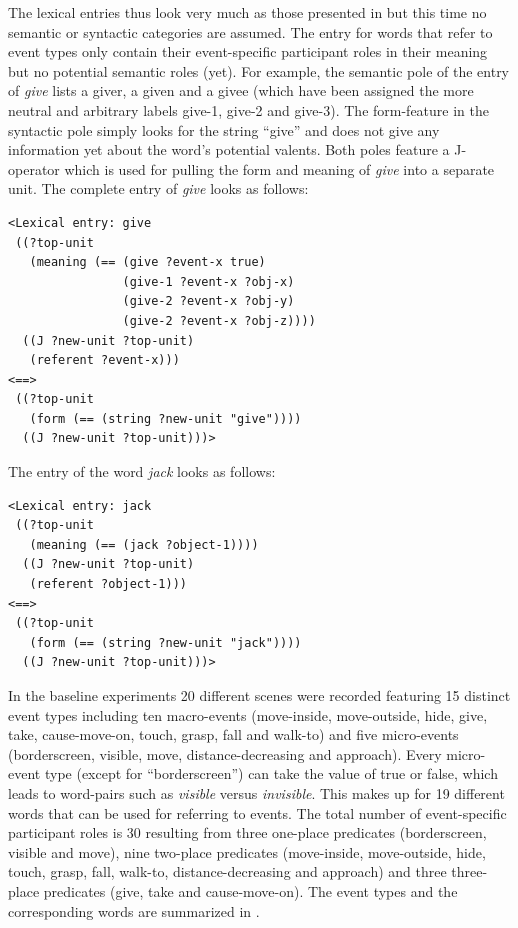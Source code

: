 The lexical entries thus look very much as those presented in  but this time no semantic or syntactic categories are assumed. The entry for words that refer to event types only contain their event-specific participant roles in their meaning but no potential semantic roles (yet). For example, the semantic pole of the entry of {\em give} lists a giver, a given and a givee (which have been assigned the more neutral and arbitrary labels give-1, give-2 and give-3). The form-feature in the syntactic pole simply looks for the string ``give'' and does not give any information yet about the word's potential valents. Both poles feature a J-operator which is used for pulling the form and meaning of {\em give} into a separate unit. The complete entry of {\em give} looks as follows:
 
\ea
\begin{lstlisting} 
<Lexical entry: give
 ((?top-unit
   (meaning (== (give ?event-x true)
                (give-1 ?event-x ?obj-x)
                (give-2 ?event-x ?obj-y)
                (give-2 ?event-x ?obj-z))))
  ((J ?new-unit ?top-unit)
   (referent ?event-x)))
<==>
 ((?top-unit
   (form (== (string ?new-unit "give"))))
  ((J ?new-unit ?top-unit)))>
\end{lstlisting}
\z

 
The entry of the word {\em jack} looks as follows:
\ea 
\begin{lstlisting}
<Lexical entry: jack
 ((?top-unit
   (meaning (== (jack ?object-1))))
  ((J ?new-unit ?top-unit)
   (referent ?object-1)))
<==>
 ((?top-unit
   (form (== (string ?new-unit "jack"))))
  ((J ?new-unit ?top-unit)))>
\end{lstlisting}
\z

In the baseline experiments 20 different scenes were recorded featuring 15 distinct event types including ten macro-events (move-inside, move-outside, hide, give, take, cause-move-on, touch, grasp, fall and walk-to) and five micro-events (borderscreen, visible, move, distance-decreasing and approach). Every micro-event type (except for ``borderscreen'') can take the value of true or false, which leads to word-pairs such as {\em visible} versus {\em invisible}. This makes up for 19 different words that can be used for referring to events. The total number of event-specific participant roles is 30 resulting from three one-place predicates (borderscreen, visible and move), nine two-place predicates (move-inside, move-outside, hide, touch, grasp, fall, walk-to, distance-decreasing and approach) and three three-place predicates (give, take and cause-move-on). The event types and the corresponding words are summarized in .

